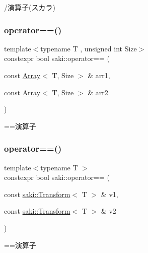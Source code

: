 /演算子(スカラ) 

\mbox{\label{namespacesaki_a2e9a71ad1df5a0fcf7c0b191ef90c1c4}} 
\subsubsection{\texorpdfstring{operator==()}{operator==()}\hspace{0.1cm}{\footnotesize\ttfamily [1/11]}}
{\footnotesize\ttfamily template$<$typename T , unsigned int Size$>$ \\
constexpr bool saki\+::operator== (\begin{DoxyParamCaption}\item[{const \mbox{\hyperlink{classsaki_1_1_array}{Array}}$<$ T, Size $>$ \&}]{arr1,  }\item[{const \mbox{\hyperlink{classsaki_1_1_array}{Array}}$<$ T, Size $>$ \&}]{arr2 }\end{DoxyParamCaption})}



==演算子 

\mbox{\label{namespacesaki_ac56eb811c4d74d9b697f061b08d9f0c6}} 
\subsubsection{\texorpdfstring{operator==()}{operator==()}\hspace{0.1cm}{\footnotesize\ttfamily [2/11]}}
{\footnotesize\ttfamily template$<$typename T $>$ \\
constexpr bool saki\+::operator== (\begin{DoxyParamCaption}\item[{const \mbox{\hyperlink{classsaki_1_1_transform}{saki\+::\+Transform}}$<$ T $>$ \&}]{v1,  }\item[{const \mbox{\hyperlink{classsaki_1_1_transform}{saki\+::\+Transform}}$<$ T $>$ \&}]{v2 }\end{DoxyParamCaption})}



==演算子 

\mbox{\label{namespacesaki_a2caa00a8041e5dd4da3baf2e2575a980}} 
